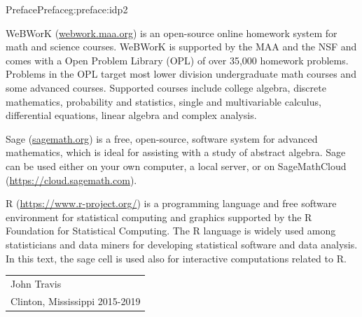 \documentclass[oneside,10pt,]{book}
\numberwithin{equation}{section}
\begin{document}
\begin{preface}{Preface}{}{Preface}{}{}{g:preface:idp2}
\par
WeBWorK (\href{http://webwork.maa.org}{webwork.maa.org}) is an open-source online homework system for math and science courses. WeBWorK is supported by the MAA and the NSF and comes with a Open Problem Library (OPL) of over 35,000 homework problems. Problems in the OPL target most lower division undergraduate math courses and some advanced courses. Supported courses include college algebra, discrete mathematics, probability and statistics, single and multivariable calculus, differential equations, linear algebra and complex analysis.%
\par
Sage (\href{http://sagemath.org}{sagemath.org}) is a free, open-source, software system for advanced mathematics, which is ideal for assisting with a study of abstract algebra. Sage can be used either on your own computer, a local server, or on SageMathCloud (\href{https://cloud.sagemath.com}{https:\slash{}\slash{}cloud.sagemath.com}).%
\par
R (\href{https://www.r-project.org/}{https:\slash{}\slash{}www.r-project.org\slash{}}) is a programming language and free software environment for statistical computing and graphics supported by the R Foundation for Statistical Computing. The R language is widely used among statisticians and data miners for developing statistical software and data analysis. In this text, the sage cell is used also for interactive computations related to R.%
\nopagebreak\par%
\hfill\begin{tabular}[t]{l@{}}
John Travis\\
Clinton, Mississippi 2015-2019
\end{tabular}\\\par
\end{preface}
\setcounter{tocdepth}{1}
\renewcommand*\contentsname{Contents}
\tableofcontents
\mainmatter
%
%
\typeout{************************************************}
\typeout{************************************************}
%
\end{document}
